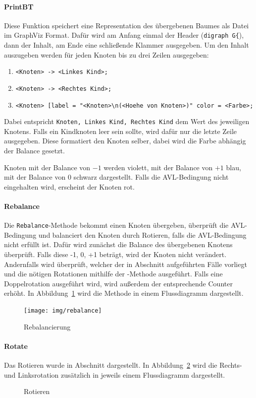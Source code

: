 \paragraph{PrintBT}\label{par:printBT}
Diese Funktion speichert eine Representation des übergebenen Baumes als Datei im GraphViz Format.
Dafür wird am Anfang einmal der Header (\verb|digraph G{|), dann der Inhalt, am Ende eine
schließende Klammer ausgegeben.
Um den Inhalt auszugeben werden für jeden Knoten bis zu drei Zeilen ausgegeben:
\begin{enumerate}
    \item \verb|<Knoten> -> <Linkes Kind>;|
    \item \verb|<Knoten> -> <Rechtes Kind>;|
    \item \verb|<Knoten> [label = "<Knoten>\n(<Hoehe von Knoten>)" color = <Farbe>;|
\end{enumerate}
Dabei entspricht \verb|Knoten, Linkes Kind, Rechtes Kind| dem Wert des jeweiligen Knotens.
Falls ein Kindknoten leer sein sollte, wird dafür nur die letzte Zeile ausgegeben.
Diese formatiert den Knoten selber, dabei wird die Farbe abhängig der Balance gesetzt.

Knoten mit der Balance von \(-1\) werden violett, mit der Balance von \(+1\)
blau, mit der Balance von \(0\) schwarz dargestellt.
Falls die AVL-Bedingung nicht eingehalten wird, erscheint der Knoten rot.

\paragraph{Rebalance}\label{par:MethodRebalance}
Die \verb|Rebalance|-Methode bekommt einen Knoten übergeben, überprüft die AVL-Bedingung und
balanciert den Knoten durch Rotieren, falls die AVL-Bedingung nicht erfüllt ist.
Dafür wird zunächst die Balance des übergebenen Knotens überprüft.
Falls diese -1, 0, +1 beträgt, wird der Knoten nicht verändert.
Andernfalls wird überprüft, welcher der in Abschnitt  aufgeführten Fälle
vorliegt und die nötigen Rotationen mithilfe der -Methode ausgeführt.
Falls eine Doppelrotation ausgeführt wird, wird außerdem der entsprechende Counter erhöht.
In Abbildung~\ref{fig:rebalance} wird die Methode in einem Flussdiagramm dargestellt.
\begin{figure}[p]
    \centering
    \texttt{[image: img/rebalance]}
    \caption{Rebalancierung}
    \label{fig:rebalance}
\end{figure}


\paragraph{Rotate}\label{par:MethodRotate}
Das Rotieren wurde in Abschnitt  dargestellt.
In Abbildung~\ref{fig:rotate} wird die Rechts- und Linksrotation zusätzlich in jeweils einem
Flussdiagramm dargestellt.
\begin{figure}[p]
    \centering
    \caption{Rotieren}
    \label{fig:rotate}
\end{figure}

